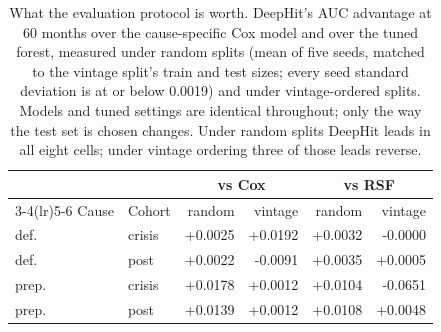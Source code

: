 \begin{table}[t]
\caption{What the evaluation protocol is worth. DeepHit's AUC advantage at 60 months over the cause-specific Cox model and over the tuned forest, measured under random splits (mean of five seeds, matched to the vintage split's train and test sizes; every seed standard deviation is at or below 0.0019) and under vintage-ordered splits. Models and tuned settings are identical throughout; only the way the test set is chosen changes. Under random splits DeepHit leads in all eight cells; under vintage ordering three of those leads reverse.}
\label{tab:protocol}
\centering\footnotesize
\setlength{\tabcolsep}{4pt}
\begin{tabular}{@{}llrrrr@{}}
\toprule
& & \multicolumn{2}{c}{vs Cox} & \multicolumn{2}{c}{vs RSF} \\
\cmidrule(lr){3-4}\cmidrule(lr){5-6}
Cause & Cohort & random & vintage & random & vintage \\
\midrule
def. & crisis & +0.0025 & +0.0192 & +0.0032 & -0.0000 \\
def. & post & +0.0022 & -0.0091 & +0.0035 & +0.0005 \\
prep. & crisis & +0.0178 & +0.0012 & +0.0104 & -0.0651 \\
prep. & post & +0.0139 & +0.0012 & +0.0108 & +0.0048 \\
\bottomrule
\end{tabular}
\end{table}
